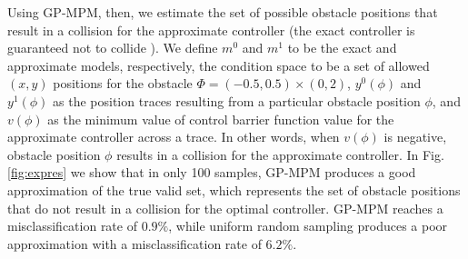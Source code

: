 \documentclass[letterpaper, 10 pt, conference]{ieeeconf}  %
\begin{document}
Using GP-MPM, then, we estimate the set of possible obstacle positions that result in a collision for the approximate controller (the exact controller is guaranteed not to collide \cite{molnar23}). We define $m^0$ and $m^1$ to be the exact and approximate models, respectively, the condition space to be a set of allowed $(x,y)$ positions for the obstacle $\Phi = (-0.5,0.5)\times(0,2)$, $y^0(\phi)$ and $y^1(\phi)$ as the position traces resulting from a particular obstacle position $\phi$, and $v(\phi)$ as the minimum value of control barrier function value for the approximate controller across a trace. In other words, when $v(\phi)$ is negative, obstacle position $\phi$ results in a collision for the approximate controller. In Fig. \ref{fig:expres} we show that in only 100 samples, GP-MPM produces a good approximation of the true valid set, which represents the set of obstacle positions that do not result in a collision for the optimal controller. GP-MPM reaches a misclassification rate of $0.9\%$, while uniform random sampling produces a poor approximation with a misclassification rate of $6.2\%$.



\end{document}
